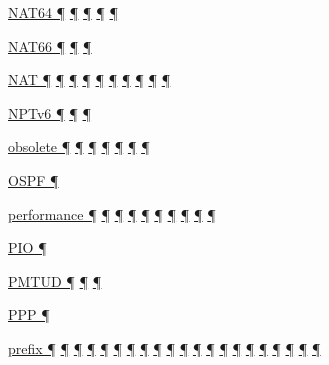 \documentclass[
]{article}
\begin{document}
\hyperref[dual-stack-scenarios]{NAT64 ¶}
\hyperref[obsolete-techniques]{¶}
\hyperref[translation-and-ipv4-as-a-service]{¶}
\hyperref[advanced-troubleshooting]{¶} \hyperref[tools]{¶}

\hyperref[ipv6-primary-differences-from-ipv4]{NAT66 ¶}
\hyperref[translation-and-ipv4-as-a-service]{¶} \hyperref[security]{¶}

\hyperref[transport-protocols]{NAT ¶} \hyperref[dual-stack-scenarios]{¶}
\hyperref[obsolete-techniques]{¶}
\hyperref[translation-and-ipv4-as-a-service]{¶} \hyperref[tunnels]{¶}
\hyperref[security]{¶} \hyperref[topology-obfuscation]{¶}
\hyperref[address-planning]{¶} \hyperref[multihoming]{¶}
\hyperref[deployment-in-the-enterprise]{¶}

\hyperref[translation-and-ipv4-as-a-service]{NPTv6 ¶}
\hyperref[security]{¶} \hyperref[multihoming]{¶}

\hyperref[how-to-keep-up-to-date]{obsolete ¶} \hyperref[addresses]{¶}
\hyperref[dns]{¶} \hyperref[obsolete-techniques]{¶}
\hyperref[tunnels]{¶} \hyperref[obsolete-features-in-ipv6]{¶}
\hyperref[further-reading]{¶}

\hyperref[routing]{OSPF ¶}

\hyperref[dual-stack-scenarios]{performance ¶}
\hyperref[ipv6-primary-differences-from-ipv4]{¶} \hyperref[filtering]{¶}
\hyperref[network-design]{¶} \hyperref[management-and-operations]{¶}
\hyperref[multihoming]{¶} \hyperref[packet-size-and-jumbo-frames]{¶}
\hyperref[troubleshooting]{¶} \hyperref[advanced-troubleshooting]{¶}
\hyperref[tools]{¶}

\hyperref[auto-configuration]{PIO ¶}

\hyperref[extension-headers-and-options]{PMTUD ¶}
\hyperref[filtering]{¶} \hyperref[packet-size-and-jumbo-frames]{¶}

\hyperref[layer-2-functions]{PPP ¶}

\hyperref[addresses]{prefix ¶} \hyperref[auto-configuration]{¶}
\hyperref[managed-configuration]{¶} \hyperref[routing]{¶}
\hyperref[source-and-destination-address-selection]{¶}
\hyperref[dual-stack-scenarios]{¶}
\hyperref[ipv6-primary-differences-from-ipv4]{¶}
\hyperref[translation-and-ipv4-as-a-service]{¶} \hyperref[tunnels]{¶}
\hyperref[security]{¶} \hyperref[filtering]{¶}
\hyperref[layer-2-considerations]{¶} \hyperref[topology-obfuscation]{¶}
\hyperref[network-design]{¶} \hyperref[address-planning]{¶}
\hyperref[prefix-per-host]{¶}
\hyperref[address-and-prefix-management]{¶}
\hyperref[multi-prefix-operation]{¶} \hyperref[multihoming]{¶}
\hyperref[advanced-troubleshooting]{¶}
\hyperref[obsolete-features-in-ipv6]{¶}
\end{document}
